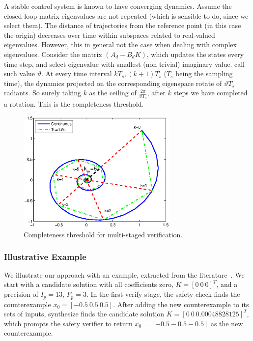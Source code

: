 \documentclass[runningheads,a4paper]{llncs}
\begin{document}
\begin{enumerate}
A stable control system is known to have converging dynamics. 
Assume the closed-loop matrix eigenvalues are not repeated (which is sensible to do, since we select them). 
The distance of trajectories from the reference point (in this case the origin) decreases over time within subspaces related to real-valued eigenvalues. 
However, this in general not the case when dealing with complex eigenvalues.  
Consider the matrix $(A_d - B_d K)$, which updates the states every time step, and select eigenvalue with smallest (non trivial) imaginary value.  
call such value $\vartheta$. 
At every time interval $kT_s, (k+1)T_s$ ($T_s$ being the sampling time), 
the dynamics projected on the corresponding eigenspace rotate of $\vartheta T_s$ radiants.  
So surely taking $k$ as the ceiling of $\frac{2\pi}{\vartheta T_s}$, 
after $k$ steps we have completed a rotation. 
This is the completeness threshold. 


\begin{figure}[t]
\centering
\includegraphics[width=0.7\textwidth]{ct.eps}
\vspace{0.1cm}
\caption{Completeness threshold for multi-staged verification.}
\end{figure}

\end{enumerate}

\subsubsection{Illustrative Example} \label{sec:running-ex}

We illustrate our approach with  an example,
extracted from the literature~\cite{Franklin15}.
%
We start with a candidate solution with all coefficients zero, $K=[0
  \ 0 \ 0]^T$, and a precision of $I_p=13$, $F_p=3$.  In the first
{\sc verify} stage, the {\sc safety} check finds the counterexample
%
$ x_0 = [-0.5 \ 0.5 \ 0.5] $.
%
After adding the new counterexample to its sets of {\sc inputs}, {\sc
  synthesize} finds the candidate solution $K=[0 \ 0
  \ 0.00048828125]^T$, which prompts the {\sc safety} verifier to
return $x_0=[-0.5 -0.5 -0.5]$ as the new counterexample.
\end{document}
